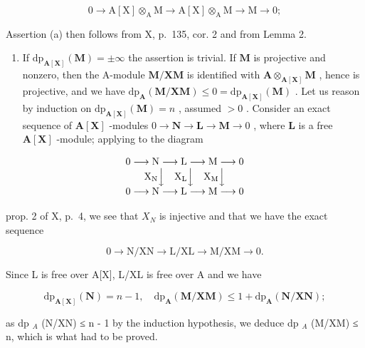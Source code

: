 \[
0 \rightarrow \mathrm{A} [ \mathrm{X} ] \otimes_ {\mathrm{A}} \mathrm{M} \rightarrow \mathrm{A} [ \mathrm{X} ] \otimes_ {\mathrm{A}} \mathrm{M} \rightarrow \mathrm{M} \rightarrow 0;
\]

Assertion (a) then follows from X, p.~135, cor. 2 and from Lemma 2.

\begin{enumerate}
\def\labelenumi{\alph{enumi})}
\setcounter{enumi}{1}
\tightlist
\item
  If \(\mathrm{dp}_{\mathbf{A}[\mathbf{X}]}(\mathbf{M}) = \pm \infty\) the assertion is trivial. If \(\mathbf{M}\) is projective and nonzero, then the A-module \(\mathbf{M} / \mathbf{XM}\) is identified with \(\mathbf{A} \otimes_{\mathbf{A}[\mathbf{X}]} \mathbf{M}\) , hence is projective, and we have \(\mathrm{dp}_{\mathbf{A}}(\mathbf{M} / \mathbf{XM}) \leqslant 0 = \mathrm{dp}_{\mathbf{A}[\mathbf{X}]}(\mathbf{M})\) . Let us reason by induction on \(\mathrm{dp}_{\mathbf{A}[\mathbf{X}]}(\mathbf{M}) = n\) , assumed \(>0\) . Consider an exact sequence of \(\mathbf{A}[\mathbf{X}]\) -modules \(0 \to \mathbf{N} \to \mathbf{L} \to \mathbf{M} \to 0\) , where \(\mathbf{L}\) is a free \(\mathbf{A}[\mathbf{X}]\) -module; applying to the diagram
\end{enumerate}

\[
\begin{array}{c} 0 \longrightarrow \mathrm{N} \longrightarrow \mathrm{L} \longrightarrow \mathrm{M} \longrightarrow 0 \\ \mathrm {X_ {N}} \Big \downarrow \quad \mathrm {X_ {L}} \Big \downarrow \quad \mathrm {X_ {M}} \Big \downarrow \\ 0 \longrightarrow \mathrm{N} \longrightarrow \mathrm{L} \longrightarrow \mathrm{M} \longrightarrow 0 \end{array}
\]

prop. 2 of X, p.~4, we see that \(X_{N}\) is injective and that we have the exact sequence

\[
0 \rightarrow \mathrm{N} / \mathrm{XN} \rightarrow \mathrm{L} / \mathrm{XL} \rightarrow \mathrm{M} / \mathrm{XM} \rightarrow 0.
\]

Since L is free over A{[}X{]}, L/XL is free over A and we have

\[
\mathrm{dp} _ {\mathbf {A} [ \mathbf {X} ]} (\mathbf {N}) = n - 1, \quad \mathrm{dp} _ {\mathbf {A}} (\mathbf {M} / \mathbf {X M}) \leqslant 1 + \mathrm{dp} _ {\mathbf {A}} (\mathbf {N} / \mathbf {X N});
\]

as dp \(_{A}\) (N/XN) ≤ n - 1 by the induction hypothesis, we deduce dp \(_{A}\) (M/XM) ≤ n, which is what had to be proved.

